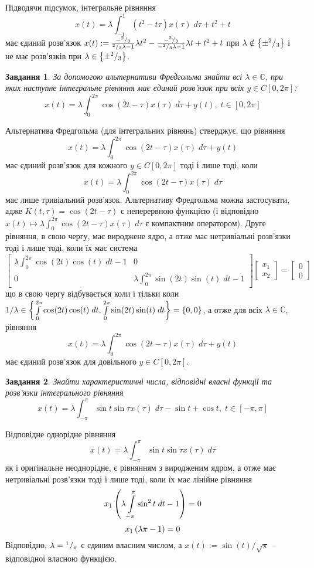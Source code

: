 \documentclass[12pt]{article} %
\newtheorem{prob}{Завдання}
\newcommand{\dt}{\;dt}
\begin{document}
		Підводячи підсумок, інтегральне рівняння
		\[x(t)=\lambda\int_{-1}^1(t^2-t\tau)x(\tau)\;d\tau+t^2+t\]
		має єдиний розв’язок $x(t):=\frac{-{^{2}/_{3}}}{{^{2}/_{3}}\lambda-1}\lambda t^2-\frac{-{^{2}/_{3}}}{-{^{2}/_{3}}\lambda-1}
		\lambda t+t^2+t$ при $\lambda\notin\left\{\pm{^{2}/_{3}}\right\}$ і не має розв’язків при $\lambda\in\left\{\pm{^{2}/_{3}}\right\}$.
\begin{prob}За допомогою альтернативи Фредгольма знайти всі $\lambda\in\mathbb{C}$, при яких наступне інтегральне рівняння
	має єдиний розв’язок при всіх $y\in C[0,2\pi]$:
	\[x(t)=\lambda\int_0^{2\pi}\cos(2t-\tau)x(\tau)\;d\tau+y(t),\;t\in[0,2\pi]\]
\end{prob}
Альтернатива Фредгольма (для інтегральних рівнянь) стверджує, що рівняння 
\[x(t)=\lambda\int_0^{2\pi}\cos(2t-\tau)x(\tau)\;d\tau+y(t)\]
має єдиний розв’язок для кожного $y\in C[0,2\pi]$ тоді і лише тоді, коли
\[x(t)=\lambda\int_0^{2\pi}\cos(2t-\tau)x(\tau)\;d\tau\]
має лише тривіальний розв’язок. Альтернативу Фредгольма можна застосувати, адже $K(t,\tau)=\cos(2t-\tau)$ є неперервною функцією 
(і відповідно $x(t)\mapsto\lambda\int_0^{2\pi}\cos(2t-\tau)x(\tau)\;d\tau$ є компактним оператором). Друге рівняння, в свою чергу, має вироджене
ядро, а отже має нетривіальні розв’язки тоді і лише тоді, коли їх має система
\[\begin{bmatrix}\lambda\int_0^{2\pi}\cos(2t)\cos(t)\;dt-1&0\\0&\lambda\int_0^{2\pi}\sin(2t)\sin(t)\;dt-1\end{bmatrix}
	\begin{bmatrix}x_1\\x_2\end{bmatrix}=\begin{bmatrix}0\\0\end{bmatrix}\]
		що в свою чергу відбувається коли і тільки коли $1/\lambda\in\mycbra{{\int_0^{2\pi}\cos(2t)\cos(t)\;dt},
		{\int_0^{2\pi}\sin(2t)\sin(t)\;dt}}=\mycbra{0,0}$, а отже для всіх $\lambda\in\mathbb{C}$, рівняння
		\[x(t)=\lambda\int_0^{2\pi}\cos(2t-\tau)x(\tau)\;d\tau+y(t)\]
		має єдиний розв’язок для довільного $y\in C[0,2\pi]$. 
\begin{prob}
	Знайти характеристичні числа, відповідні власні функції та розв’язки інтегрального рівняння
	\[x(t)=\lambda\int_{-\pi}^{\pi}\sin t\sin\tau x(\tau)\;d\tau-\sin t+\cos t,\;t\in[-\pi,\pi]\]
\end{prob}
	Відповідне однорідне рівняння
	\[x(t)=\lambda\int_{-\pi}^{\pi}\sin t\sin\tau x(\tau)\;d\tau\]
	як і оригінальне неоднорідне, є рівнянням з виродженим ядром, а отже має нетривіальні розв’язки тоді і лише тоді, коли їх має лінійне
	рівняння
	\[x_1\mybra{\lambda\int_{-\pi}^\pi\sin^2 t\dt-1}=0\]
	\[x_1\left(\lambda\pi-1\right)=0\]
	Відповідно, $\lambda={^{1}/_{\pi}}$ є єдиним власним числом, а $x(t):=\sin(t)/\sqrt{\pi}$ -- відповідної власною функцією.
\end{document}
